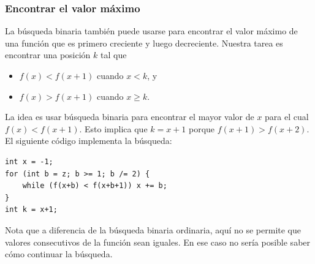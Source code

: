 \subsubsection{Encontrar el valor máximo}

La búsqueda binaria también puede usarse para encontrar
el valor máximo de una función que es
primero creciente y luego decreciente.
Nuestra tarea es encontrar una posición $k$ tal que

\begin{itemize}
\item
$f(x)<f(x+1)$ cuando $x<k$, y
\item
$f(x)>f(x+1)$ cuando $x \ge k$.
\end{itemize}

La idea es usar búsqueda binaria
para encontrar el mayor valor de $x$
para el cual $f(x)<f(x+1)$.
Esto implica que $k=x+1$
porque $f(x+1)>f(x+2)$.
El siguiente código implementa la búsqueda:

\begin{lstlisting}
int x = -1;
for (int b = z; b >= 1; b /= 2) {
    while (f(x+b) < f(x+b+1)) x += b;
}
int k = x+1;
\end{lstlisting}

Nota que a diferencia de la búsqueda binaria ordinaria,
aquí no se permite que valores consecutivos
de la función sean iguales.
En ese caso no sería posible saber
cómo continuar la búsqueda.
